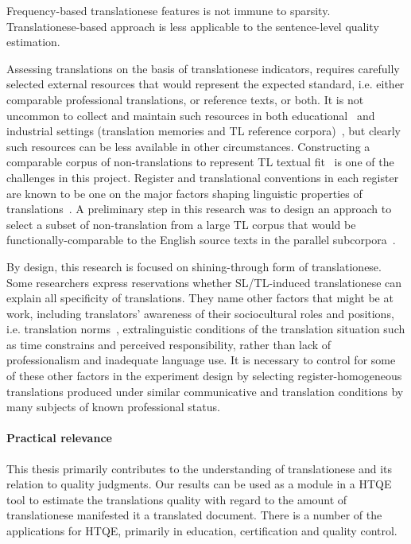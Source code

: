 Frequency-based translationese features is not immune to sparsity. Translationese-based approach is less applicable to the sentence-level quality estimation.

Assessing translations on the basis of translationese indicators, requires carefully selected external resources that would represent the expected standard, i.e. either comparable professional translations, or reference texts, or both. It is not uncommon to collect and maintain such resources in both educational~\citep{Bowker2001} and industrial settings (translation memories and \gls*{TL} reference corpora)~\citep{Massey2019}, but clearly such resources can be less available in other circumstances. 
Constructing a comparable corpus of non-translations to represent \gls*{TL} textual fit~\citep{Chesterman2004} is one of the challenges in this project. Register and translational conventions in each register are known to be one on the major factors shaping linguistic properties of translations~\cite{Lapshinova2017}. A preliminary step in this research was to design an approach to select a subset of non-translation from a large TL corpus that would be functionally-comparable to the English source texts in the parallel subcorpora~\cite{Kunilovskaya2019crossling}.

By design, this research is focused on shining-through form of translationese. Some researchers express reservations whether SL/TL-induced translationese can explain all specificity of translations. They name other factors that might be at work, including translators' awareness of their sociocultural roles and positions, i.e. translation norms~\cite{Laviosa2008, Delaere2012}, extralinguistic conditions of the translation situation such as time constrains and perceived responsibility, rather than lack of professionalism and inadequate language use. It is necessary to control for some of these other factors in the experiment design by selecting register-homogeneous translations produced under similar communicative and translation conditions by many subjects of known professional status.

\paragraph{Practical relevance} This thesis primarily contributes to the understanding of translationese and its relation to quality judgments. Our results can be used as a module in a \gls{HTQE} tool to estimate the translations quality with regard to the amount of translationese manifested it a translated document. There is a number of the applications for \gls*{HTQE}, primarily in education, certification and quality control.

